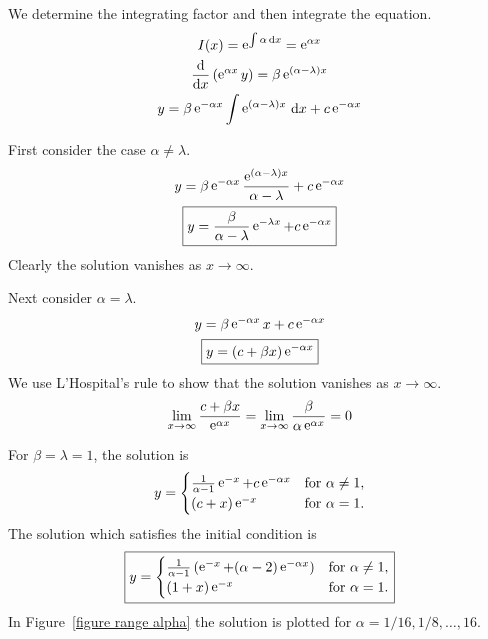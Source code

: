 \begin{Solution}
  \label{solution dydx + alpha y = beta e}
  We determine the integrating factor and then integrate the equation.
  \begin{gather*}
    I(x) = \mathop{\mathrm{e}}\nolimits^{\int \alpha \,\mathrm{d} x} = \mathop{\mathrm{e}}\nolimits^{\alpha x}
    \\
    \frac{\mathrm{d}}{\mathrm{d} x} \left( \mathop{\mathrm{e}}\nolimits^{\alpha x} y \right) = \beta \mathop{\mathrm{e}}\nolimits^{(\alpha-\lambda)x} 
    \\
    y = \beta \mathop{\mathrm{e}}\nolimits^{-\alpha x} \int \mathop{\mathrm{e}}\nolimits^{(\alpha - \lambda) x} \,\mathrm{d} x + c \mathop{\mathrm{e}}\nolimits^{-\alpha x}
  \end{gather*}

  First consider the case $\alpha \neq \lambda$.
  \begin{gather*}
    y = \beta \mathop{\mathrm{e}}\nolimits^{-\alpha x} \frac{\mathop{\mathrm{e}}\nolimits^{(\alpha - \lambda) x}}{\alpha - \lambda} + c \mathop{\mathrm{e}}\nolimits^{- \alpha x} 
    \\
    \boxed{
      y = \frac{\beta}{\alpha - \lambda} \mathop{\mathrm{e}}\nolimits^{-\lambda x} + c \mathop{\mathrm{e}}\nolimits^{- \alpha x} 
      }
  \end{gather*}
  Clearly the solution vanishes as $x \to \infty$.

  Next consider $\alpha = \lambda$.
  \begin{gather*}
    y = \beta \mathop{\mathrm{e}}\nolimits^{-\alpha x} x + c \mathop{\mathrm{e}}\nolimits^{- \alpha x} 
    \\
    \boxed{
      y = (c + \beta x) \mathop{\mathrm{e}}\nolimits^{-\alpha x} 
      }
  \end{gather*}
  We use L'Hospital's rule to show that the solution vanishes as $x \to \infty$.
  \[
  \lim_{x \to \infty} \frac{c + \beta x}{\mathop{\mathrm{e}}\nolimits^{\alpha x}}
  = \lim_{x \to \infty} \frac{\beta}{\alpha \mathop{\mathrm{e}}\nolimits^{\alpha x}}
  = 0
  \]

  For $\beta = \lambda = 1$, the solution is
  \[
  y = \begin{cases}
    \frac{1}{\alpha - 1} \e^{-x} + c \e^{- \alpha x} &\mathrm{for}\ \alpha \neq 1, \\
    (c + x) \e^{-x} &\mathrm{for}\ \alpha = 1.
  \end{cases}
  \]
  The solution which satisfies the initial condition is
  \[
  \boxed{
    y = \begin{cases}
      \frac{1}{\alpha - 1} \left( \mathop{\mathrm{e}}\nolimits^{-x} + (\alpha-2) \mathop{\mathrm{e}}\nolimits^{- \alpha x} \right)
      &\mathrm{for}\ \alpha \neq 1, \\
      (1 + x) \mathop{\mathrm{e}}\nolimits^{-x} &\mathrm{for}\ \alpha = 1.
    \end{cases}
    }
  \]
  In Figure~\ref{figure range alpha} the solution is plotted for 
  $\alpha=1/16, 1/8, \ldots, 16$.


\end{Solution}
